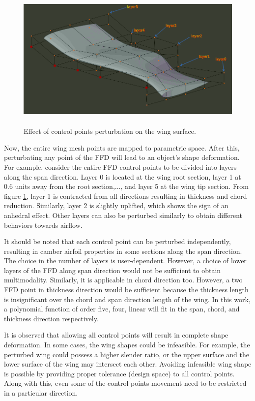 \begin{figure}
    \centering
    \includegraphics[height = 70mm, width=\textwidth]{figures/wing_FFD-_displaced.png}
    \caption{Effect of control points perturbation on the wing surface.}
    \label{ffd_box_perturbed}
\end{figure}
Now, the entire wing mesh points are mapped to parametric space. After this, perturbating any point of the FFD will lead to an object's shape deformation. For example, consider the entire FFD control points to be divided into layers along the span direction. Layer 0 is located at the wing root section, layer 1 at 0.6 units away from the root section,$ \dots $, and layer 5 at the wing tip section. From figure \ref{ffd_box_perturbed}, layer 1 is contracted from all directions resulting in thickness and chord reduction. Similarly, layer 2 is slightly uplifted, which shows the sign of an anhedral effect. Other layers can also be perturbed similarly to obtain different behaviors towards airflow.

It should be noted that each control point can be perturbed independently, resulting in camber airfoil properties in some sections along the span direction. The choice in the number of layers is user-dependent. However, a choice of lower layers of the FFD along span direction would not be sufficient to obtain multimodality. Similarly, it is applicable in chord direction too. However, a two FFD point in thickness direction would be sufficient because the thickness length is insignificant over the chord and span direction length of the wing. In this work, a polynomial function of order five, four, linear will fit in the span, chord, and thickness direction respectively.

It is observed that allowing all control points will result in complete shape deformation. In some cases, the wing shapes could be infeasible. For example, the perturbed wing could possess a higher slender ratio, or the upper surface and the lower surface of the wing may intersect each other. Avoiding infeasible wing shape is possible by providing proper tolerance (design space) to all control points. Along with this, even some of the control points movement need to be restricted in a particular direction. 

